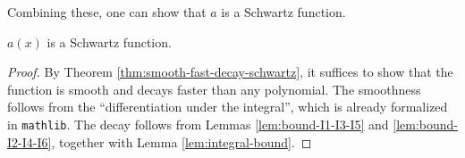 Combining these, one can show that $a$ is a Schwartz function.
\begin{proposition}\label{prop:a-schwartz}\leanok
{}
$a(x)$ is a Schwartz function.
\end{proposition}
\begin{proof}\leanok
{}
By Theorem \ref{thm:smooth-fast-decay-schwartz}, it suffices to show that the function is smooth and decays faster than any polynomial.
The smoothness follows from the ``differentiation under the integral'', which is already formalized in \texttt{mathlib}.
The decay follows from Lemmas \ref{lem:bound-I1-I3-I5} and \ref{lem:bound-I2-I4-I6}, together with Lemma \ref{lem:integral-bound}.
\end{proof}

